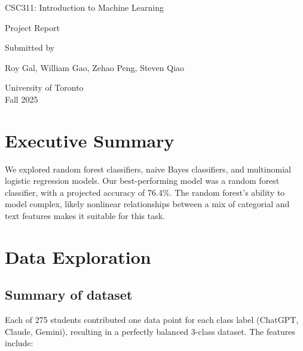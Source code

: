 \documentclass[12pt]{article}
\begin{document}
\begin{titlepage}
    \centering
    \vspace*{3cm}

    {\Large {CSC311: Introduction to Machine Learning} \par}
    \vspace{1cm}
    
    {\Large {Project Report} \par}
    \vspace{1cm}
    
    \vspace{3cm}
    
    {\large Submitted by \par}
    \vspace{0.5cm}
    {\large Roy Gal, William Gao, Zehao Peng, Steven Qiao \par}
    
    \vfill
    {\large University of Toronto \\ Fall 2025 \par}
\end{titlepage}
\clearpage
\setcounter{page}{1}

\section{Executive Summary}

We explored random forest classifiers, naive Bayes classifiers, and multinomial logistic regression models. Our best-performing model was a random forest classifier, with a projected accuracy of 76.4\%. The random forest's ability to model complex, likely nonlinear relationships between a mix of categorial and text features makes it suitable for this task.

\section{Data Exploration} 

\subsection{Summary of dataset}
Each of 275 students contributed one data point for each class label (ChatGPT, Claude, Gemini), resulting in a perfectly balanced 3-class dataset. The features include:
\end{document}
